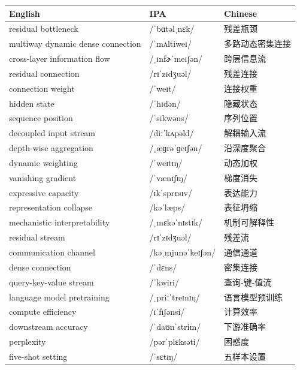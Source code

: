 \documentclass[UTF8,12pt,a4paper]{ctexart}
\providecommand{\zh}[1]{#1}
\begin{document}
\begin{tabular*}{\textwidth}{@{\extracolsep{\fill}}lll@{}}
\toprule
\textbf{English} & \textbf{IPA} & \textbf{Chinese} \\
\midrule
residual bottleneck & {\ipafont /ˈbɑtəlˌnɛk/} & \zh{残差瓶颈} \\
multiway dynamic dense connection & {\ipafont /ˈmʌltiweɪ/} & \zh{多路动态密集连接} \\
cross-layer information flow & {\ipafont /ˌɪnfɚˈmeɪʃən/} & \zh{跨层信息流} \\
residual connection & {\ipafont /rɪˈzɪdʒuəl/} & \zh{残差连接} \\
connection weight & {\ipafont /ˈweɪt/} & \zh{连接权重} \\
hidden state & {\ipafont /ˈhɪdən/} & \zh{隐藏状态} \\
sequence position & {\ipafont /ˈsikwəns/} & \zh{序列位置} \\
decoupled input stream & {\ipafont /diːˈkʌpəld/} & \zh{解耦输入流} \\
depth-wise aggregation & {\ipafont /ˌæɡrəˈɡeɪʃən/} & \zh{沿深度聚合} \\
dynamic weighting & {\ipafont /ˈweɪtɪŋ/} & \zh{动态加权} \\
vanishing gradient & {\ipafont /ˈvænɪʃɪŋ/} & \zh{梯度消失} \\
expressive capacity & {\ipafont /ɪkˈsprɛsɪv/} & \zh{表达能力} \\
representation collapse & {\ipafont /kəˈlæps/} & \zh{表征坍缩} \\
mechanistic interpretability & {\ipafont /ˌmɛkəˈnɪstɪk/} & \zh{机制可解释性} \\
residual stream & {\ipafont /rɪˈzɪdʒuəl/} & \zh{残差流} \\
communication channel & {\ipafont /kəˌmjunəˈkeɪʃən/} & \zh{通信通道} \\
dense connection & {\ipafont /ˈdɛns/} & \zh{密集连接} \\
query-key-value stream & {\ipafont /ˈkwiri/} & \zh{查询-键-值流} \\
language model pretraining & {\ipafont /ˌpriːˈtreɪnɪŋ/} & \zh{语言模型预训练} \\
compute efficiency & {\ipafont /ɪˈfɪʃənsi/} & \zh{计算效率} \\
downstream accuracy & {\ipafont /ˈdaʊnˈstrim/} & \zh{下游准确率} \\
perplexity & {\ipafont /pərˈplɛksəti/} & \zh{困惑度} \\
five-shot setting & {\ipafont /ˈsɛtɪŋ/} & \zh{五样本设置} \\

\end{tabular*}
\end{document}
